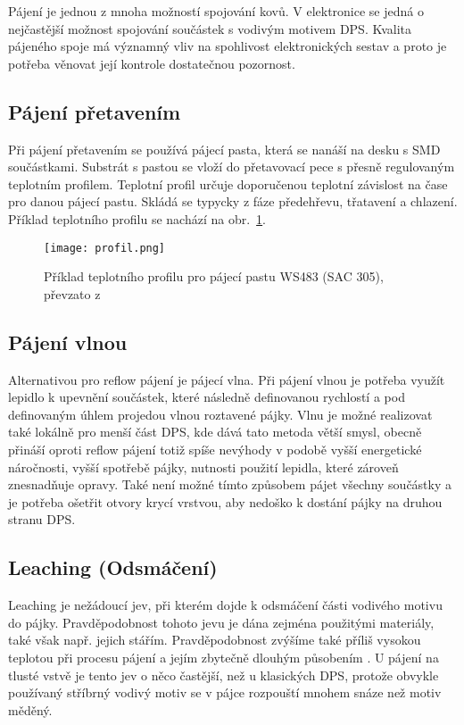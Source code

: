 Pájení je jednou z mnoha možností spojování kovů. V elektronice se jedná o nejčastější možnost spojování součástek s vodivým motivem DPS. Kvalita pájeného spoje má významný vliv na spohlivost elektronických sestav a proto je potřeba věnovat její kontrole dostatečnou pozornost.

\subsection{Pájení přetavením}
Při pájení přetavením se používá pájecí pasta, která se nanáší na desku s SMD součástkami. Substrát s pastou se vloží do přetavovací pece s přesně regulovaným teplotním profilem. Teplotní profil určuje doporučenou teplotní závislost na čase pro danou pájecí pastu. Skládá se typycky z fáze předehřevu, třatavení a chlazení. Příklad teplotního profilu se nachází na obr.~\ref{fig:profil.png}.

\begin{figure}[h!]
    \centering
    \texttt{[image: profil.png]}
    \caption{Příklad teplotního profilu pro pájecí pastu WS483 (SAC 305), převzato z \cite{aimsolder_datasheet}}
    \label{fig:profil.png}
\end{figure}

\subsection{Pájení vlnou}
    Alternativou pro reflow pájení je pájecí vlna. Při pájení vlnou je potřeba využít lepidlo k upevnění součástek, které následně definovanou rychlostí a pod definovaným úhlem projedou vlnou roztavené pájky. Vlnu je možné realizovat také lokálně pro menší část DPS, kde dává tato metoda větší smysl, obecně přináší oproti reflow pájení totiž spíše nevýhody v podobě vyšší energetické náročnosti, vyšší spotřebě pájky, nutnosti použití lepidla, které zároveň znesnadňuje opravy. Také není možné tímto způsobem pájet všechny součástky a je potřeba ošetřit otvory krycí vrstvou, aby nedoško k dostání pájky na druhou stranu DPS. 

\subsection{Leaching (Odsmáčení)}
    Leaching je nežádoucí jev, při kterém dojde k odsmáčení části vodivého motivu do pájky. Pravděpodobnost tohoto jevu je dána zejména použitými materiály, také však např. jejich stářím. Pravděpodobnost zvýšíme také příliš vysokou teplotou při procesu pájení a jejím zbytečně dlouhým působením  \cite{zadani}. U pájení na tlusté vstvě je tento jev o něco častější, než u klasických DPS, protože obvykle používaný stříbrný vodivý motiv se v pájce rozpouští mnohem snáze než motiv měděný.



